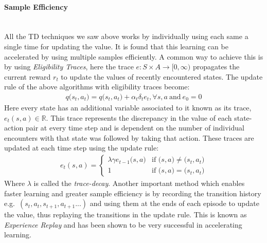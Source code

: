 \documentclass[14pt]{extarticle}
\newcommand{\myparagraph}[1]{\paragraph{#1}\mbox{}\\ \linebreak}
\numberwithin{equation}{section}
\begin{document}
	\myparagraph{Sample Efficiency}
	All the TD techniques we saw above works by individually using each same a single time for updating the value. It is found that this learning can be accelerated by using multiple samples efficiently. A common way to achieve this is by using \textit{Eligibility Traces}, here the trace $e \colon S \times A \rightarrow [0,\infty)$ propagates the current reward $r_t$ to update the values of recently encountered states. The update rule of the above algorithms with eligibility traces become:
	\begin{align}
	q\big(s_t,a_t\big) = q\big(s_t,a_t\big) + \alpha_t\delta_{t}e_t, \forall s,a \ \text{and} \ e_0 = 0
	\end{align}
 	Here every state has an additional variable associated to it known as its trace, $e_t(s,a) \in \mathbb{R}$. This trace represents the discrepancy in the value of each state-action pair at every time step and is dependent on the number of individual encounters with that state was followed by taking that action. These traces are updated at each time step using the update rule:
 	\begin{align}
 	e_t(s,a) = \begin{cases}
 	\lambda\gamma e_{t-1}\big(s,a\big) & \text{if }\big(s,a\big) \neq \big(s_t,a_t\big) \\    
 	1 & \text{if }\big(s,a\big) = \big(s_t,a_t\big)
 	\end{cases}
 	\end{align}
	Where $\lambda$ is called the \textit{trace-decay}.
	Another important method which enables faster learning and greater sample efficiency is by recording the transition history e.g.\ $(s_t,a_t,s_{t+1},a_{t+1}...)$ and using them at the ends of each episode to update the value, thus replaying the transitions in the update rule. This is known as \textit{Experience Replay} and has been shown to be very successful in accelerating learning\cite{adam2012experience}.
		
\end{document}
